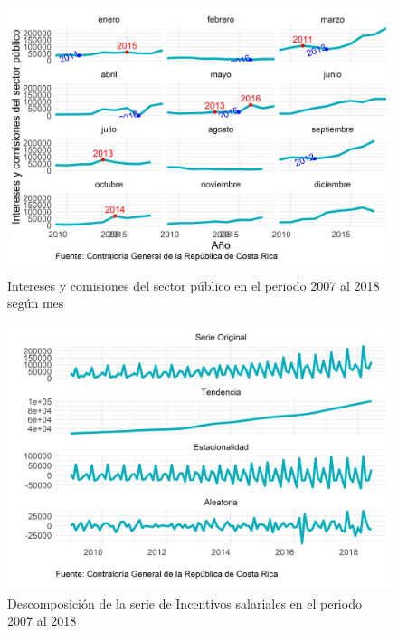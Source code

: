 \documentclass[
]{article}
\begin{document}
\begin{figure}[H]
\includegraphics[width=1\linewidth,height=1\textheight]{Tesis_files/figure-latex/interesesplotperiodos-1} \caption{Intereses y comisiones del sector público en el periodo 2007 al 2018 según mes}\label{fig:interesesplotperiodos}
\end{figure}

\begin{figure}[H]
\includegraphics[width=1\linewidth,height=1\textheight]{Tesis_files/figure-latex/interesesplotdescomposicion-1} \caption{Descomposición de la serie de Incentivos salariales en el periodo 2007 al 2018}\label{fig:interesesplotdescomposicion}
\end{figure}
\end{document}

